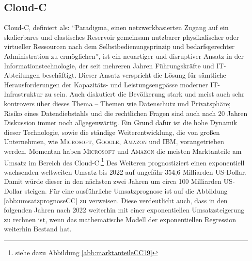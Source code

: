 \subsection{\ac{Cloud-C}}
\ac{Cloud-C}, definiert als: \enquote{Paradigma, einen netzwerkbasierten Zugang auf ein skalierbares und  elastisches Reservoir gemeinsam nutzbarer physikalischer oder virtueller Ressourcen nach dem Selbstbedienungsprinzip und bedarfsgerechter Administration zu ermöglichen}\autocite[][S.7]{dindeutsches_institut_fur_normung_informationstechnik_2020-2}, ist ein neuartiger und disruptiver Ansatz in der Informationstechnologie, der seit mehreren Jahren Führungskräfte und IT-Abteilungen beschäftigt. Dieser Ansatz verspricht die Lösung für sämtliche Herausforderungen der Kapazitäts- und Leistungsengpässe moderner IT-Infrastruktur zu sein.\autocite[vgl.][S.4]{reinheimer_cloud_2018} Auch diskutiert die Bevölkerung stark und meist auch sehr kontrovers über dieses Thema -- Themen wie Datenschutz und Privatsphäre; Risiko eines Datendiebstahls und die rechtlichen Fragen sind auch nach 20 Jahren Diskussion immer noch allgegenwärtig. Ein Grund dafür ist die hohe Dynamik dieser Technologie, sowie die ständige Weiterentwicklung, die von großen Unternehmen, wie \textsc{Microsoft}, \textsc{Google}, \textsc{Amazon} und \textsc{IBM}, vorangetrieben werden. Momentan haben \textsc{Microsoft} und \textsc{Amazon} die meisten Marktanteile am Umsatz im Bereich des \ac{Cloud-C}.\footnote{siehe dazu Abbildung \vref{abb:marktanteileCC19}} Des Weiteren prognostiziert \cite{gartner_cloud_2019} einen exponentiell wachsenden weltweiten Umsatz bis 2022 auf ungefähr 354,6 Milliarden US-Dollar. Damit würde dieser in den nächsten zwei Jahren um circa 100 Milliarden US-Dollar steigen. Für eine ausführliche Umsatzprognose ist auf die Abbildung \vref{abb:umsatzprognoseCC} zu verweisen. Diese verdeutlicht auch, dass in den folgenden Jahren nach 2022 weiterhin mit einer exponentiellen Umsatzsteigerung zu rechnen ist, wenn das mathematische Modell der exponentiellen Regression weiterhin Bestand hat. 
\par
